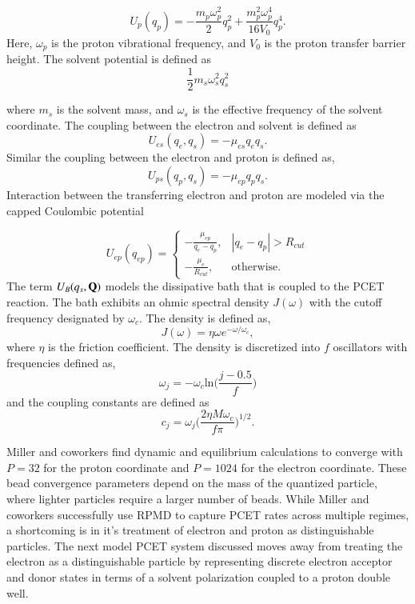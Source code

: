 \documentclass[phd,tocprelim]{cornell}
\begin{document}
\begin{equation}
U_p(q_p)= - \frac{m_p \omega_p^2}{2} q_p^2+  \frac{m_p^2 \omega_p^4}{16V_0} q_p^4.
\end{equation}
 Here, $\omega_p$ is the proton vibrational frequency, and $V_0$ is the proton transfer barrier height. The solvent potential is defined as 
 \begin{equation}
 \frac{1}{2} m_s \omega_s^2 q_s^2
 \end{equation}
 
 where $m_s$ is the solvent mass, and $\omega_s$ is the effective frequency of the solvent coordinate. The coupling between the electron and solvent is defined as
 \begin{equation}
 U_{es}(q_{e}, q_s)=-\mu_{es} q_e q_s.
 \end{equation}
Similar the coupling between the electron and proton is defined as,
 \begin{equation}
 U_{ps}(q_{p}, q_s)=-\mu_{ep} q_p q_s.
 \end{equation}
 Interaction between the transferring electron and proton are modeled via the capped Coulombic potential
 
 \begin{equation}
   U_{ep}(q_{ep})=\left\{
     \begin{array}{ll}
       - \frac{\mu_{ep}}{q_e-q_p}, & |q_e-q_p|>R_{cut}\\
    -\frac{ \mu_e}{R_{cut}}, & \textrm{otherwise}.
    \end{array}\right.
    \label{eq:hs}
\end{equation}
The term $U_B(q_s , {\bf{Q}})$ models the dissipative bath that is coupled to the PCET reaction. The bath exhibits an ohmic spectral density $J(\omega)$ with the cutoff frequency designated by $\omega_c$. The density is defined as, 
\begin{equation}
J(\omega) = \eta \omega e^{-\omega/\omega_c},
\end{equation}
where $\eta$ is the friction coefficient. The density is discretized into $f$ oscillators with frequencies defined as,
\begin{equation}
\omega_j = - \omega_c \textrm{ln} \bigg( \frac{j - 0.5}{f} \bigg) 
\end{equation}
and the coupling constants are defined as 
\begin{equation} 
c_j = \omega_j \bigg( \frac{2 \eta M \omega_c}{f \pi} \bigg)^{1/2}.
\end{equation} 

Miller and coworkers find dynamic and equilibrium calculations to converge with $P=32$ for the proton coordinate and $P=1024$ for the electron coordinate. These bead convergence parameters depend on the mass of the quantized particle, where lighter particles require a larger number of beads. While Miller and coworkers successfully use RPMD to capture PCET rates across multiple regimes, a shortcoming is in it's treatment of electron and proton as distinguishable particles. The next model PCET system discussed moves away from treating the electron as a distinguishable particle by representing discrete electron acceptor and donor states in terms of a solvent polarization coupled to a proton double well. 
\end{document}

